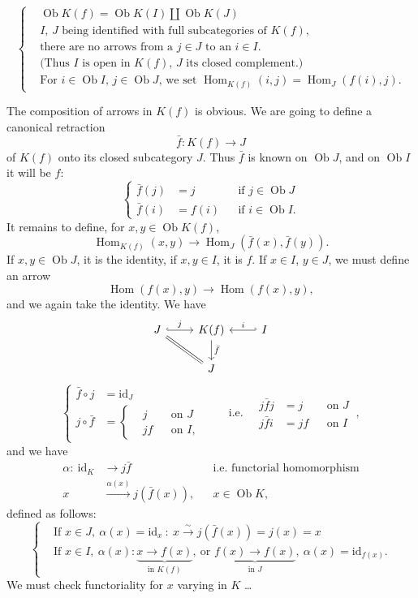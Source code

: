 \documentclass[11pt]{article}
\newcommand{\printedpage}[1]{\marginpar{\footnotesize p.~#1}}
\newcommand{\msp}[1]{\marginpar{\footnotesize [#1]}}
\newcommand{\Hom}{\operatorname{Hom}}
\newcommand{\Ob}{\operatorname{Ob}}
\newcommand{\id}{\mathrm{id}}
\begin{document}
\[
\left\{
\begin{aligned}
&\Ob K(f) = \Ob K(I) \amalg \Ob K(J) \qquad \\
&\text{$I$, $J$ being identified with full subcategories of $K(f)$,}\\
&\text{there are no arrows from a $j \in J$ to an $i \in I$.}\\
&\text{(Thus $I$ is open in $K(f)$, $J$ its closed complement.)}\\
&\text{For $i \in \Ob I$, $j \in \Ob J$, we set $\Hom_{K(f)}(i,j) = \Hom_J(f(i),j)$.}
\end{aligned}
\right.
\]

The composition of arrows in $K(f)$ is obvious. We are going to define a canonical retraction
\[ \bar{f} : K(f) \longrightarrow J \]
of $K(f)$ onto its closed subcategory $J$. Thus $\bar{f}$ is known on $\Ob J$, and on $\Ob I$ it will be $f$:
\[
\left\{
\begin{aligned}
\bar{f}(j) &= j && \text{if } j \in \Ob J\\
\bar{f}(i) &= f(i) && \text{if } i \in \Ob I.
\end{aligned}
\right.
\]
It remains to define, for $x, y \in \Ob K(f)$,
\msp{page 80}
\[ \Hom_{K(f)}(x,y) \longrightarrow \Hom_J(\bar{f}(x), \bar{f}(y)). \]
If $x, y \in \Ob J$, it is the identity, if $x, y \in I$, it is $f$. If $x \in I$, $y \in J$, we must define an arrow
\[ \Hom(f(x),y) \longrightarrow \Hom(f(x),y), \]
and we again take the identity. We have
\[
\begin{tikzcd}
J \arrow[r, hook, "j"] \arrow[dr, equal] & K(f) \arrow[d, "\bar{f}"] & I \arrow[l, hook', "i"'] \\
& J &
\end{tikzcd}
\]
\[
\left\{
\begin{aligned}
\bar{f} \circ j &= \id_J\\
j \circ \bar{f} &= \left\{
\begin{aligned}
&j && \text{on } J\\
&jf && \text{on } I,
\end{aligned}
\right.
\end{aligned}
\right.
\qquad \text{i.e.} \quad
\boxed{
\begin{aligned}
j\bar{f}j &= j && \text{on } J\\
j\bar{f}i &= jf && \text{on } I
\end{aligned}
}\ ,
\]
and we have
\[
\begin{aligned}
\alpha :\ \id_K &\longrightarrow j\bar{f} && \text{i.e. functorial homomorphism}\\
x &\xrightarrow{\alpha(x)} j(\bar{f}(x)), && x \in \Ob K,
\end{aligned}
\]
\printedpage{6}
defined as follows:
\[
\left\{
\begin{aligned}
&\text{If } x \in J,\ \alpha(x) = \id_x\ :\ x \xrightarrow{\sim} j(\bar{f}(x)) = j(x) = x\\
&\text{If } x \in I,\ \alpha(x) : \underbrace{x \longrightarrow f(x)}_{\text{in } K(f)},\ \text{or } \underbrace{f(x) \longrightarrow f(x)}_{\text{in } J},\ \alpha(x) = \id_{f(x)}.
\end{aligned}
\right.
\]
We must check functoriality for $x$ varying in $K$ \dots
\end{document}
